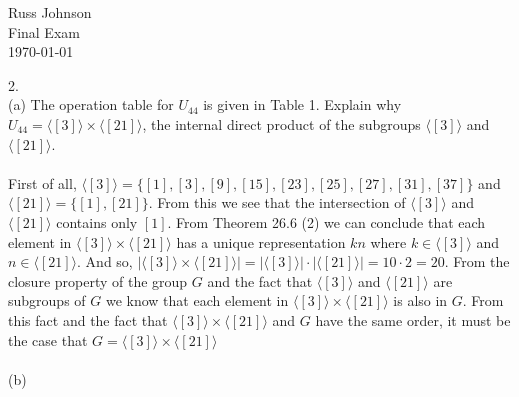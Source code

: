 \documentclass[11pt]{article}
\begin{document}
\begin{flushright}
Russ Johnson\\
Final Exam\\
\today\\
\end{flushright}

2.\\
(a) The operation table for $U_{44}$ is given in Table 1. Explain why $U_44=\langle [3] \rangle \times \langle [21] \rangle$, the internal direct product of the subgroups $\langle [3] \rangle$ and $\langle [21] \rangle$.\\
~\\
First of all, $\langle [3] \rangle = \{[1],[3],[9],[15],[23],[25],[27],[31],[37]\}$ and $\langle [21] \rangle = \{[1],[21]\}$. 
From this we see that the intersection of $\langle [3] \rangle$ and $\langle [21] \rangle$ contains only $[1]$. 
From Theorem 26.6 (2) we can conclude that each element in $\langle [3] \rangle \times \langle [21] \rangle$ has a unique representation $kn$ 
where $k\in \langle [3] \rangle$ and $n\in \langle [21] \rangle$. And so, 
$ |\langle [3] \rangle \times \langle [21] \rangle| = |\langle [3] \rangle|\cdot |\langle [21] \rangle | = 10\cdot 2 = 20. $ 
From the closure property of the group $G$ and the fact that $\langle [3] \rangle $ and $ \langle [21] \rangle$ are subgroups of $G$ we know that each element in $ \langle [3] \rangle \times \langle [21] \rangle $ is also in $G$. From this fact and the fact that $ \langle [3] \rangle \times \langle [21] \rangle $ and $G$ have the same order, it must be the case that $ G= \langle [3] \rangle \times \langle [21] \rangle $\\
~\\
(b) 
\end{document}
